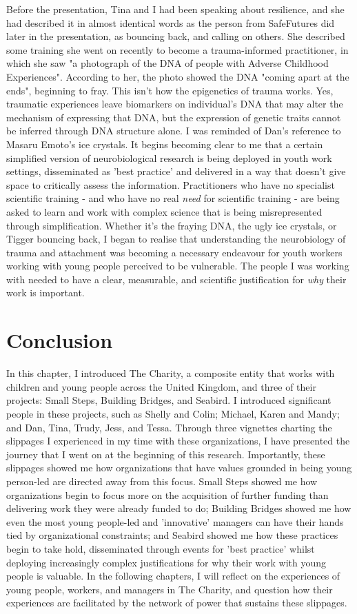 Before the presentation, Tina and I had been speaking about resilience, and she had described it in almost identical words as the person from SafeFutures did later in the presentation, as bouncing back, and calling on others. She described some training she went on recently to become a trauma-informed practitioner, in which she saw "a photograph of the DNA of people with Adverse Childhood Experiences". According to her, the photo showed the DNA "coming apart at the ends", beginning to fray. This isn't how the epigenetics of trauma works. Yes, traumatic experiences leave biomarkers on individual's DNA that may alter the mechanism of expressing that DNA, but the expression of genetic traits cannot be inferred through DNA structure alone. I was reminded of Dan's reference to Masaru Emoto's ice crystals. It begins becoming clear to me that a certain simplified version of neurobiological research is being deployed in youth work settings, disseminated as 'best practice' and delivered in a way that doesn't give space to critically assess the information. Practitioners who have no specialist scientific training - and who have no real \textit{need} for scientific training - are being asked to learn and work with complex science that is being misrepresented through simplification. Whether it's the fraying DNA, the ugly ice crystals, or Tigger bouncing back, I began to realise that understanding the neurobiology of trauma and attachment was becoming a necessary endeavour for youth workers working with young people perceived to be vulnerable. The people I was working with needed to have a clear, measurable, and scientific justification for \textit{why} their work is important.

\section{Conclusion}

In this chapter, I introduced The Charity, a composite entity that works with children and young people across the United Kingdom, and three of their projects: Small Steps, Building Bridges, and Seabird. I introduced significant people in these projects, such as Shelly and Colin; Michael, Karen and Mandy; and Dan, Tina, Trudy, Jess, and Tessa. Through three vignettes charting the slippages I experienced in my time with these organizations, I have presented the journey that I went on at the beginning of this research. Importantly, these slippages showed me how organizations that have values grounded in being young person-led are directed away from this focus. Small Steps showed me how organizations begin to focus more on the acquisition of further funding than delivering work they were already funded to do; Building Bridges showed me how even the most young people-led and 'innovative' managers can have their hands tied by organizational constraints; and Seabird showed me how these practices begin to take hold, disseminated through events for 'best practice' whilst deploying increasingly complex justifications for why their work with young people is valuable. In the following chapters, I will reflect on the experiences of young people, workers, and managers in The Charity, and question how their experiences are facilitated by the network of power that sustains these slippages.